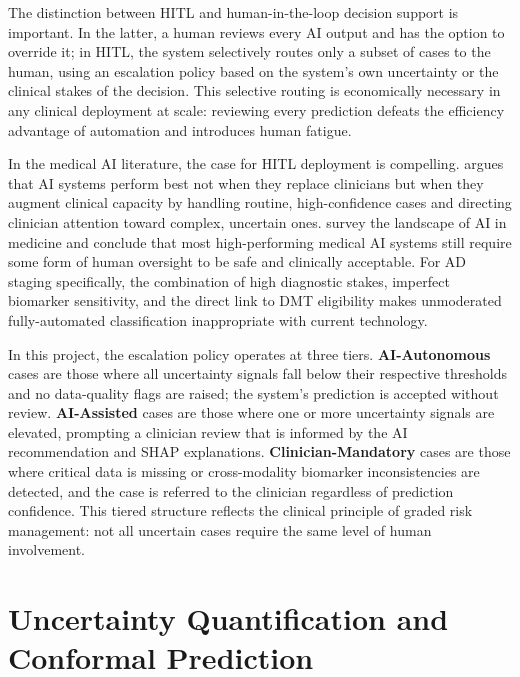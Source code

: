 \documentclass[12pt, a4paper]{report}
\begin{document}
  The distinction between HITL and human-in-the-loop decision support is important.
  In the latter, a human reviews every AI output and has the option to override it; in
  HITL, the system selectively routes only a subset of cases to the human, using an
  escalation policy based on the system's own uncertainty or the clinical stakes of
  the decision. This selective routing is economically necessary in any clinical
  deployment at scale: reviewing every prediction defeats the efficiency advantage
  of automation and introduces human fatigue.

  In the medical AI literature, the case for HITL deployment is compelling.
  \citet{topol2019highperformance} argues that AI systems perform best not when they
  replace clinicians but when they augment clinical capacity by handling routine,
  high-confidence cases and directing clinician attention toward complex, uncertain ones.
  \citet{rajpurkar2022ai} survey the landscape of AI in medicine and conclude that
  most high-performing medical AI systems still require some form of human oversight
  to be safe and clinically acceptable. For AD staging specifically, the combination
  of high diagnostic stakes, imperfect biomarker sensitivity, and the direct link to
  DMT eligibility makes unmoderated fully-automated classification inappropriate with
  current technology.

  In this project, the escalation policy operates at three tiers.
  \textbf{AI-Autonomous} cases are those where all uncertainty signals fall below
  their respective thresholds and no data-quality flags are raised; the system's
  prediction is accepted without review. \textbf{AI-Assisted} cases are those where
  one or more uncertainty signals are elevated, prompting a clinician review that is
  informed by the AI recommendation and SHAP explanations. \textbf{Clinician-Mandatory}
  cases are those where critical data is missing or cross-modality biomarker
  inconsistencies are detected, and the case is referred to the clinician regardless
  of prediction confidence. This tiered structure reflects the clinical principle of
  graded risk management: not all uncertain cases require the same level of human
  involvement.

  \section{Uncertainty Quantification and Conformal Prediction}
  \label{sec:uq}
\end{document}
